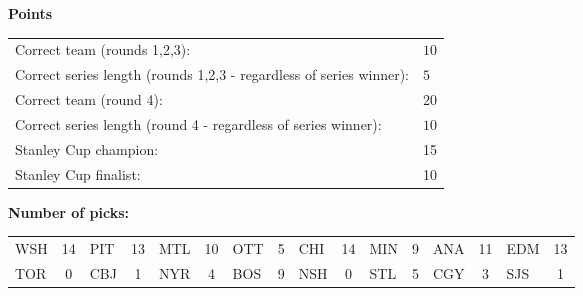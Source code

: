 \documentclass[10pt]{article}
\begin{document}
{\bf Points}\\
\begin{minipage}{12cm}
    \begin{tabular}{l l}
        Correct team (rounds 1,2,3):	& $10$\\
        Correct series length (rounds 1,2,3 - regardless of series winner):	& $5$\\
        Correct team (round 4):	& $20$\\
        Correct series length (round 4 - regardless of series winner):	& $10$\\
        Stanley Cup champion:	& 15\\
        Stanley Cup finalist:	& 10\\
    \end{tabular}

    \vspace{0.5cm}
    {\bf Number of picks:}\\
    \begin{tabular}{lc | lc | lc | lc | lc | lc | lc | lc }
        WSH & 14 & PIT & 13 & MTL & 10 & OTT & 5 & CHI & 14 & MIN & 9 & ANA & 11 & EDM & 13 \\
        TOR & 0 & CBJ & 1 & NYR & 4 & BOS & 9 & NSH & 0 & STL & 5 & CGY & 3 & SJS & 1 \\
    \end{tabular}
\end{minipage}
\end{document}
